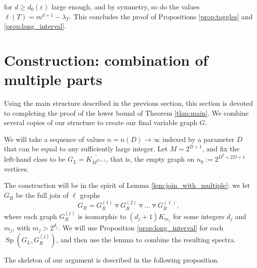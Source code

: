 \documentclass[10pt,a4paper]{article}
\numberwithin{equation}{section}
\newcommand{\eps}{\varepsilon}
\DeclareMathOperator{\Sp}{Sp}
\begin{document}
for $d\ge d_0(\eps)$ large enough, and by symmetry, so do the values $\ell(T)=m^{d+1}-\lambda_T$. This concludes the proof of Propositions \ref{prop:toggles} and \ref{prop:long_interval}.

\section{Construction: combination of multiple parts}\label{sec:constr_combination}

Using the main structure described in the previous section, this section is devoted to completing the proof of the lower bound of Theorem \ref{thm:main}. We combine several copies of our structure to create our final variable graph $G$.

We will take a sequence of values $n=n(D)\to \infty$ indexed by a parameter $D$ that can be equal to any sufficiently large integer. Let $M=2^{D+1}$, and fix the left-hand class to be $G_L=\overline{K_{M^{D+1}}}$, that is, the empty graph on $n_0:=2^{D^2+2D+1}$ vertices.

The construction will be in the spirit of Lemma \ref{lem:join_with_multiple}: we let $G_R$ be the full join of $\ell$ graphs $$G_R=G^{(1)}_R\triangledown G^{(2)}_R \triangledown \dots\triangledown G^{(\ell)}_R,$$ where each graph $G^{(j)}_R$ is isomorphic to $(d_j+1)K_{m_j}$ for some integers $d_j$ and $m_j$, with $m_j>2^{d_j}$. We will use Proposition \ref{prop:long_interval} for each $\Sp(G_L, G^{(j)}_R)$, and then use the lemma to combine the resulting spectra.

The skeleton of our argument is described in the following proposition.
\end{document}
